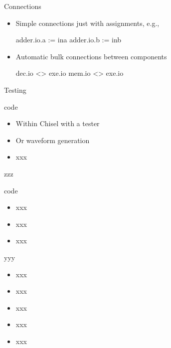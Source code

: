 \documentclass[xcolor=pdflatex,dvipsnames,table]{beamer}
\begin{document}
\begin{frame}[fragile]{Connections}
\begin{itemize}
\item Simple connections just with assignments, e.g.,
\begin{chisel}
  adder.io.a := ina
  adder.io.b := inb
\end{chisel}
\item Automatic bulk connections between components
\begin{chisel}
  dec.io <> exe.io
  mem.io <> exe.io
\end{chisel}
\end{itemize}
\end{frame}

\begin{frame}[fragile]{Testing}
\begin{chisel}
code
\end{chisel}
\begin{itemize}
\item Within Chisel with a tester
\item Or waveform generation
\item xxx
\end{itemize}
\end{frame}

\begin{frame}[fragile]{zzz}
\begin{chisel}
code
\end{chisel}
\begin{itemize}
\item xxx
\item xxx
\item xxx
\end{itemize}
\end{frame}

\begin{frame}[fragile]{yyy}
\begin{itemize}
\item xxx
\item xxx
\item xxx
\item xxx
\item xxx
\end{itemize}
\end{frame}
\end{document}
